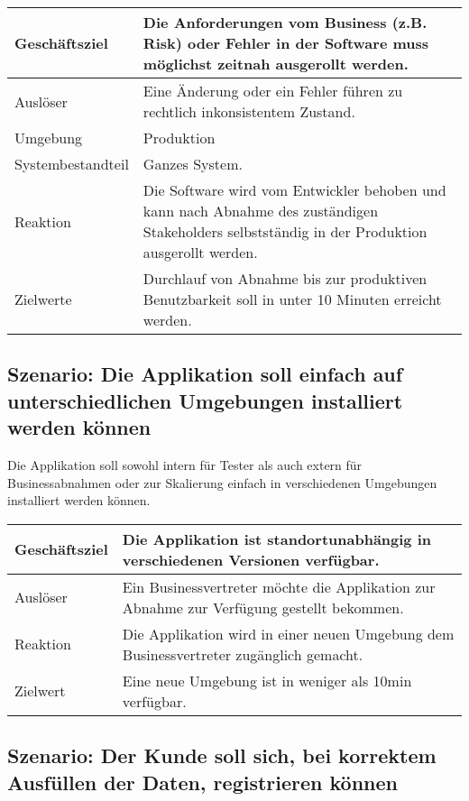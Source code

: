 \begin{table}[H]
	\centering
	\begin{tabular}{ | p{3cm} | p{12cm} | }
		\toprule
		Geschäftsziel & Die Anforderungen vom Business (z.B. Risk) oder Fehler in der Software muss möglichst zeitnah ausgerollt werden. \\ \hline
		Auslöser & Eine Änderung oder ein Fehler führen zu rechtlich inkonsistentem Zustand. \\ \hline
		Umgebung & Produktion\\ \hline
		Systembestandteil & Ganzes System. \\ \hline
		Reaktion & Die Software wird vom Entwickler behoben und kann nach Abnahme des zuständigen Stakeholders selbstständig in der Produktion ausgerollt werden. \\ \hline
		Zielwerte & Durchlauf von Abnahme bis zur produktiven Benutzbarkeit soll in unter 10 Minuten erreicht werden.\\
		\bottomrule
	\end{tabular}
\end{table}

\subsection{Szenario: Die Applikation soll einfach auf unterschiedlichen Umgebungen installiert werden können}

Die Applikation soll sowohl intern für Tester als auch extern für Businessabnahmen oder zur Skalierung einfach in verschiedenen Umgebungen installiert werden können.

\begin{table}[H]
	\centering
	\begin{tabular}{ | p{3cm} | p{12cm} | }
		\toprule
		Geschäftsziel & Die Applikation ist standortunabhängig in verschiedenen Versionen verfügbar. \\ \hline
		Auslöser & Ein Businessvertreter möchte die Applikation zur Abnahme zur Verfügung gestellt bekommen. \\ \hline
		Reaktion & Die Applikation wird in einer neuen Umgebung dem Businessvertreter zugänglich gemacht. \\ \hline
		Zielwert & Eine neue Umgebung ist in weniger als 10min verfügbar. \\
		\bottomrule
	\end{tabular}
\end{table}

\subsection{Szenario: Der Kunde soll sich, bei korrektem Ausfüllen der Daten, registrieren können}

